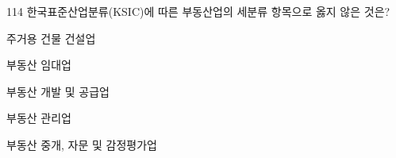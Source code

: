 \begin{question}{114}
한국표준산업분류(KSIC)에 따른 부동산업의 세분류 항목으로 옳지 않은 것은?
\begin{choices}
  \item 주거용 건물 건설업
  \item 부동산 임대업
  \item 부동산 개발 및 공급업
  \item 부동산 관리업
  \item 부동산 중개, 자문 및 감정평가업
\end{choices}
\end{question}
